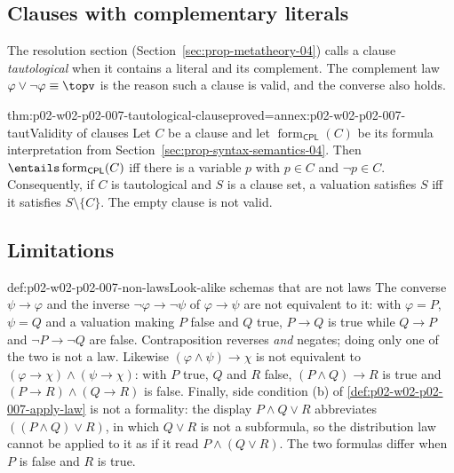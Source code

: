\subsection{Clauses with complementary literals}
\label{sec:p02-w02-p02-007-clauses}

The resolution section (Section~\ref{sec:prop-metatheory-04}) calls a clause
\emph{tautological} when it contains a literal and its complement.  The
complement law \(\varphi\lor\neg\varphi\equiv\topv\) is the reason such a
clause is valid, and the converse also holds.

\begin{hblemma}{thm:p02-w02-p02-007-tautological-clause}{proved=annex:p02-w02-p02-007-taut}{Validity of clauses}
Let \(C\) be a clause and let \(\operatorname{form}_{\mathsf{CPL}}(C)\) be its formula
interpretation from Section~\ref{sec:prop-syntax-semantics-04}.  Then
\(\entails\operatorname{form}_{\mathsf{CPL}}(C)\) iff there is a variable \(p\) with
\(p\in C\) and \(\neg p\in C\).  Consequently, if \(C\) is tautological and
\(S\) is a clause set, a valuation satisfies \(S\) iff it satisfies
\(S\setminus\{C\}\).  The empty clause is not valid.
\end{hblemma}

\subsection{Limitations}
\label{sec:p02-w02-p02-007-limitations}

\begin{hbwarning}{def:p02-w02-p02-007-non-laws}{Look-alike schemas that are not laws}
The converse \(\psi\to\varphi\) and the inverse \(\neg\varphi\to\neg\psi\)
of \(\varphi\to\psi\) are not equivalent to it: with \(\varphi=P\),
\(\psi=Q\) and a valuation making \(P\) false and \(Q\) true,
\(P\to Q\) is true while \(Q\to P\) and \(\neg P\to\neg Q\) are false.
Contraposition reverses \emph{and} negates; doing only one of the two is not
a law.  Likewise \((\varphi\land\psi)\to\chi\) is not equivalent to
\((\varphi\to\chi)\land(\psi\to\chi)\): with \(P\) true, \(Q\) and \(R\)
false, \((P\land Q)\to R\) is true and \((P\to R)\land(Q\to R)\) is false.
Finally, side condition (b) of \cref{def:p02-w02-p02-007-apply-law} is not
a formality: the display \(P\land Q\lor R\) abbreviates
\(((P\land Q)\lor R)\), in which \(Q\lor R\) is not a subformula, so the
distribution law cannot be applied to it as if it read
\(P\land(Q\lor R)\).  The two formulas differ when \(P\) is false and
\(R\) is true.
\end{hbwarning}

